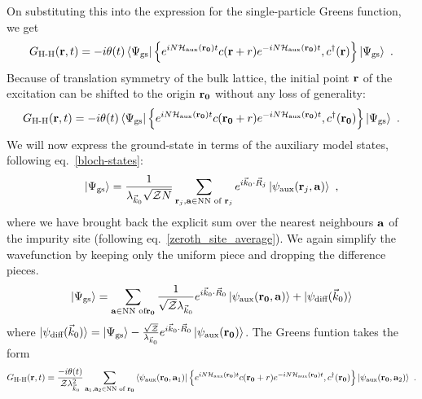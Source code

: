 \documentclass[reprint,hidelinks]{revtex4-2}
\begin{document}
On substituting this into the expression for the single-particle Greens function, we get
\begin{equation}\begin{aligned}
	G_\text{H-H}({\bf r}, t) = -i\theta(t) \braket{\Psi_\text{gs} | \left\{ e^{i N \mathcal{H}_\text{aux}({\bf r_0}) t}c({\bf r} + r)e^{-i N \mathcal{H}_\text{aux}({\bf r_0}) t}, c^\dagger({\bf r}) \right\} | \Psi_\text{gs}}~.
\end{aligned}\end{equation}
Because of translation symmetry of the bulk lattice, the initial point \({\bf r}\) of the excitation can be shifted to the origin \({\bf r_0}\) without any loss of generality:
\begin{equation}\begin{aligned}
	G_\text{H-H}({\bf r}, t) = -i\theta(t) \braket{\Psi_\text{gs} | \left\{ e^{i N \mathcal{H}_\text{aux}({\bf r_0}) t}c({\bf r_0} + r)e^{-i N \mathcal{H}_\text{aux}({\bf r_0}) t}, c^\dagger({\bf r_0}) \right\} | \Psi_\text{gs}}~.
\end{aligned}\end{equation}
We will now express the ground-state in terms of the auxiliary model states, following eq.~\ref{bloch-states}:
\begin{equation}\begin{aligned}
	\ket{\Psi_\text{gs}} = \frac{1}{\lambda_{\vec k_0} \sqrt{\mathcal{Z} N}}\sum_{{\bf r}_j, {\bf a} \in \text{NN of }{\bf r}_j} e^{i \vec{k}_0\cdot\vec{R}_j} \ket{\psi_\text{aux}({\bf r}_j, {\bf a})}~,
\end{aligned}\end{equation}
where we have brought back the explicit sum over the nearest neighbours \({\bf a}\) of the impurity site (following eq.~\ref{zeroth_site_average}).
We again simplify the wavefunction by keeping only the uniform piece and dropping the difference pieces.
\begin{equation}\begin{aligned}
	\ket{\Psi_\text{gs}} = \sum_{{\bf a} \in \text{NN of}{\bf r_0}}\frac{1}{\sqrt \mathcal{Z}\lambda_{\vec k_0}} e^{i\vec{k}_0\cdot\vec{R}_0} \ket{\psi_\text{aux}({\bf r_0}, {\bf a})} + \ket{\psi_\text{diff}(\vec k_0)}
\end{aligned}\end{equation}
where \(\ket{\psi_\text{diff}(\vec k_0)} = \ket{\Psi_\text{gs}} - \frac{\sqrt \mathcal{Z}}{\lambda_{\vec k_0}} e^{i\vec{k}_0\cdot\vec{R}_0} \ket{\psi_\text{aux}({\bf r_0})}\). The Greens funtion takes the form
\begin{equation}\begin{aligned}
G_\text{H-H}({\bf r}, t) =  \frac{-i\theta(t)}{\mathcal{Z} \lambda_{\vec k_0}^2}\sum_{{\bf a}_1, {\bf a}_2 \in \text{NN of }{\bf r_0}}\braket{\psi_\text{aux}({\bf r_0}, {\bf a}_1) | \left\{ e^{i N \mathcal{H}_\text{aux}({\bf r_0}) t}c({\bf r_0} + r)e^{-i N \mathcal{H}_\text{aux}({\bf r_0}) t}, c^\dagger({\bf r_0}) \right\} | \psi_\text{aux}({\bf r_0}, {\bf a}_2)}~.
\end{aligned}\end{equation}
\end{document}
